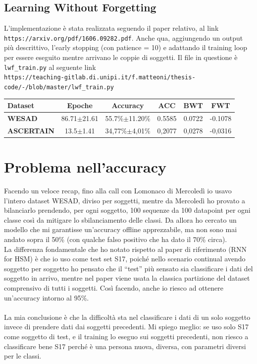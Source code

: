 \documentclass[11pt, a4paper, twoside, openright]{book}
\begin{document}
\subsection{Learning Without Forgetting}
L'implementazione è stata realizzata seguendo il paper relativo, al link\\ \texttt{https://arxiv.org/pdf/1606.09282.pdf}. Anche qua, aggiungendo un output più descrittivo, l'early stopping (con patience = 10) e adattando il training loop per essere eseguito mentre arrivano le coppie di soggetti. Il file in questione è \texttt{lwf\_train.py} al seguente link\\ \texttt{https://teaching-gitlab.di.unipi.it/f.matteoni/thesis-code/-/blob/master/lwf\_train.py}
\begin{tabular}{l|c|c|c|c|c}
    \textbf{Dataset} & \textbf{Epoche} & \textbf{Accuracy} & \textbf{ACC} & \textbf{BWT} & \textbf{FWT} \\
    \hline 
    \textbf{WESAD} & 86.71$\pm$21.61 & 55.7\%$\pm$11.20\% & 0.5585 & 0.0722 & -0.1078\\
    \textbf{ASCERTAIN} & 13.5$\pm$1.41 & 34,77\%$\pm$4,01\%& 0,2077 & 0,0278 & -0,0316
\end{tabular}

\section{Problema nell'accuracy}
Facendo un veloce recap, fino alla call con Lomonaco di Mercoledì io usavo l’intero dataset WESAD, diviso per soggetti, mentre da Mercoledì ho provato a bilanciarlo prendendo, per ogni soggetto, 100 sequenze da 100 datapoint per ogni classe così da mitigare lo sbilanciamento delle classi. Da allora ho cercato un modello che mi garantisse un’accuracy offline apprezzabile, ma non sono mai andato sopra il 50\% (con qualche falso positivo che ha dato il 70\% circa).\\
La differenza fondamentale che ho notato rispetto al paper di riferimento (RNN for HSM) è che io uso come test set S17, poiché nello scenario continual avendo soggetto per soggetto ho pensato che il “test” più sensato sia classificare i dati del soggetto in arrivo, mentre nel paper viene usata la classica partizione del dataset comprensivo di tutti i soggetti. Così facendo, anche io riesco ad ottenere un’accuracy intorno al 95\%.\\\\
La mia conclusione è che la difficoltà sta nel classificare i dati di un solo soggetto invece di prendere dati dai soggetti precedenti. Mi spiego meglio: se uso solo S17 come soggetto di test, e il training lo eseguo sui soggetti precedenti, non riesco a classificare bene S17 perché è una persona nuova, diversa, con parametri diversi per le classi.
\end{document}
